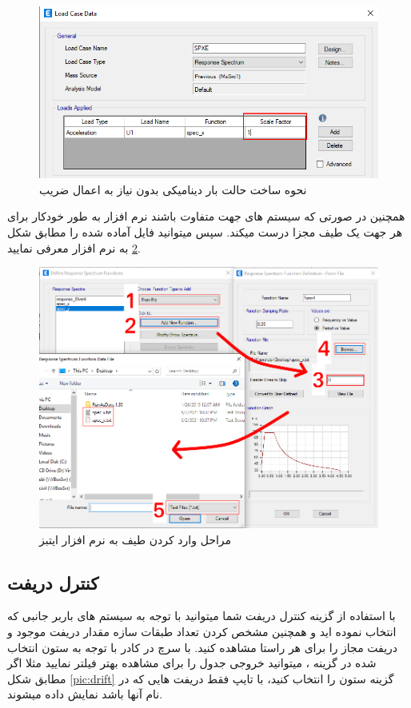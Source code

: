 \begin{figure}
    \centering
    \includegraphics[scale=.7]{figures/spec_scale.png}
    \caption{نحوه ساخت حالت بار دینامیکی بدون نیاز به اعمال ضریب}
    \label{pic:spec_scale}
\end{figure}

همچنین در صورتی که سیستم های جهت 
متفاوت باشند نرم افزار به طور خودکار برای هر جهت یک طیف مجزا درست میکند. سپس میتوانید فایل آماده شده را مطابق شکل
\ref{pic:spec}
به نرم افزار معرفی نمایید.

\begin{figure}[H]
    \centering
    \includegraphics[scale=.7]{figures/spec}
    \caption{مراحل وارد کردن طیف به نرم افزار ایتبز}
    \label{pic:spec}
\end{figure}

\subsection{کنترل دریفت}
با استفاده از گزینه کنترل دریفت شما میتوانید با توجه به سیستم های باربر جانبی که انتخاب نموده اید و همچنین مشخص کردن تعداد طبقات سازه مقدار دریفت موجود و دریفت مجاز را برای هر راستا مشاهده کنید.
با سرچ در کادر 
با توجه به ستون انتخاب شده در گزینه 
، میتوانید خروجی جدول را برای مشاهده بهتر فیلتر نمایید مثلا اگر مطابق شکل
\ref{pic:drift}
گزینه ستون را
انتخاب کنید، با تایپ 
فقط دریفت هایی که در نام آنها  باشد نمایش داده میشوند.


